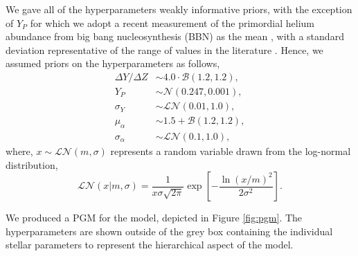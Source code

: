 \documentclass[a4paper,fleqn,usenatbib]{mnras}
\begin{document}
We gave all of the hyperparameters weakly informative priors, with the exception of $Y_P$ for which we adopt a recent measurement of the primordial helium abundance from big bang nucleosynthesis (BBN) as the mean \citep{Pitrou.Coc.ea2018}, with a standard deviation representative of the range of values in the literature \citep{Aver.Olive.ea2015, Peimbert.Peimbert.ea2016, Cooke.Fumagalli2018}. Hence, we assumed priors on the hyperparameters as follows,
%
\begin{align*}
    {\Delta Y}/{\Delta Z} &\sim 4.0\cdot\mathcal{B}(1.2, 1.2),\\
    Y_P &\sim \mathcal{N}(0.247, 0.001),\\
    \sigma_Y &\sim \mathcal{LN}(0.01, 1.0),\\
    \mu_\alpha &\sim 1.5 + \mathcal{B}(1.2, 1.2),\\
    \sigma_\alpha &\sim \mathcal{LN}(0.1, 1.0),
\end{align*}
%
where, $x \sim \mathcal{LN}(m, \sigma)$ represents a random variable drawn from the log-normal distribution,
%
\begin{equation}
    \mathcal{LN}(x | m, \sigma)=  \frac{1}{x \sigma \sqrt{2 \pi}} \exp \left[ - \frac{\ln (x / m)^{2}}{2 \sigma^{2}}\right].
\end{equation}
%

We produced a PGM for the model, depicted in Figure \ref{fig:pgm}. The hyperparameters are shown outside of the grey box containing the individual stellar parameters to represent the hierarchical aspect of the model.
\end{document}

